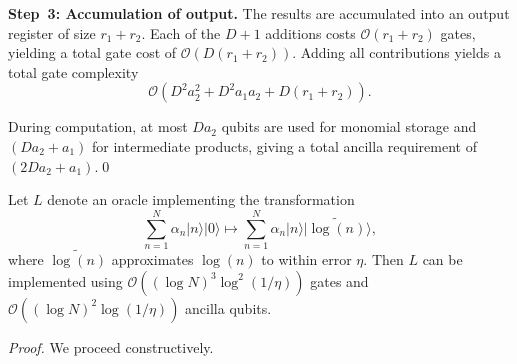 \documentclass[aps,pra,twocolumn,superscriptaddress,preprintnumbers,amsmath,amssymb]{revtex4-2}
\begin{document}
\textbf{Step~3: Accumulation of output.} 
The results are accumulated into an output register of size \( r_1 + r_2 \). Each of the \( D + 1 \) additions costs \( \mathcal{O}(r_1 + r_2) \) gates, yielding a total gate cost of \( \mathcal{O}(D (r_1 + r_2)) \). 
Adding all contributions yields a total gate complexity
\begin{equation}
\mathcal{O}\!\left(D^{2}a_2^{2} + D^{2}a_1a_2 + D(r_1+r_2)\right).
\end{equation}\par
During computation, at most  \( D a_2 \) qubits are used for monomial storage and 
\( (D a_2 + a_1) \)  for intermediate products, giving a total ancilla requirement of 
 \( (2D a_2 + a_1) \).\qed

 \begin{lemma}\label{the:log}
    Let $L$ denote an oracle implementing the transformation 
    \begin{equation}
        \sum_{n=1}^{N} \alpha_n|n\rangle|0\rangle \mapsto \sum_{n=1}^{N}\alpha_n|n\rangle|\widetilde{\log(n)}\rangle,
    \end{equation}
    where $\widetilde{\log(n)}$ approximates $\log(n)$ to within error $\eta$. Then $L$ can be implemented using 
       $\mathcal{O}((\log N)^3 \log^2(1/\eta))$
    gates and $\mathcal{O}((\log N)^2 \log(1/\eta))$ ancilla qubits. 
\end{lemma}
\noindent\textit{Proof.} We proceed constructively. 
\end{document}
